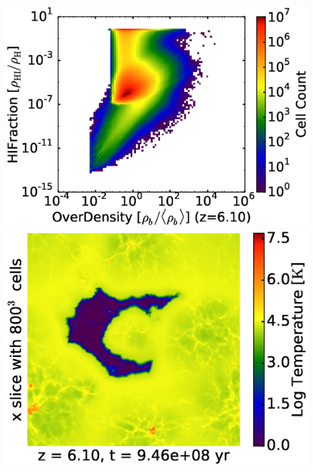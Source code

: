 \begin{figure}[!tp]
\begin{minipage}[h]{0.33\linewidth}
	\includegraphics[trim = 7mm 9mm 1mm 7mm, clip, width=1.0\textwidth]{3_1_HD14475OverDensityHIFraction.eps}
	\end{minipage}
\hspace*{-2.00mm}
	\begin{minipage}[h]{0.33\linewidth}
	\centering
	\includegraphics[trim = 10mm 0mm 7mm 7mm, clip, width=1.0\textwidth]{3_2_slice_Temperature_x_HD14475.eps}
	\end{minipage}
\hspace*{-2.00mm}
	\begin{minipage}[h]{0.33\linewidth}
	\centering

\end{minipage}
\end{figure}
